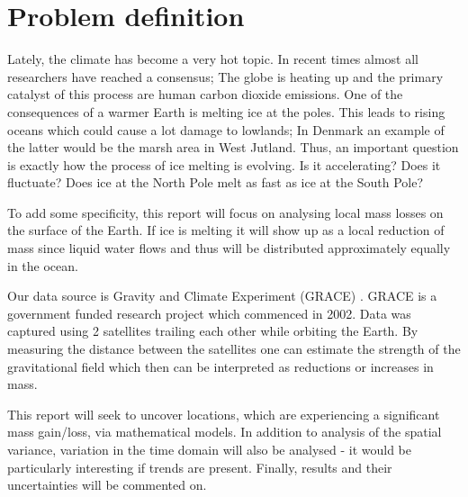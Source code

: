 \section{Problem definition}
Lately, the climate has become a very hot topic. 
In recent times almost all researchers have reached a consensus; 
The globe is heating up and the primary catalyst of this process are human carbon dioxide emissions.
One of the consequences of a warmer Earth is melting ice at the poles.
This leads to rising oceans which could cause a lot damage to lowlands;
In Denmark an example of the latter would be the marsh area in West Jutland.
Thus, an important question is exactly how the process of ice melting is evolving. 
Is it accelerating? Does it fluctuate? Does ice at the North Pole melt as fast as ice at the South Pole?

To add some specificity, this report will focus on analysing  local mass losses on the surface of the Earth.
If ice is melting it will show up as a local reduction of mass since liquid water flows and thus will be distributed approximately equally in the ocean. 

Our data source is Gravity and Climate Experiment (GRACE) \cite{GRACE-data-source}. 
GRACE is a government funded research project which commenced in 2002. Data was captured using 2 satellites trailing each other while orbiting the Earth.
 By measuring the distance between the satellites one can estimate the strength of the gravitational field which then can be interpreted as reductions or increases in mass.


This report will seek to uncover locations, which are experiencing a significant mass gain/loss, via mathematical models. 
In addition to analysis of the spatial variance, variation in the time domain will also be analysed - it would be particularly interesting if trends are present.
Finally, results and their uncertainties will be commented on.
